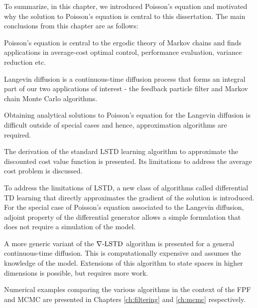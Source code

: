 To summarize, in this chapter, we introduced Poisson's equation and motivated why the solution to Poisson's equation is central to this dissertation. The main conclusions from this chapter are as follows:
\begin{romannum}
	\item Poisson's equation is central to the ergodic theory of Markov chains and finds applications in average-cost optimal control, performance evaluation, variance reduction etc. 
	\item Langevin diffusion is a continuous-time diffusion process that forms an integral part of our two applications of interest - the feedback particle filter and Markov chain Monte Carlo algorithms. 
	\item Obtaining analytical solutions to Poisson's equation for the Langevin diffusion is difficult outside of special cases and hence, approximation algorithms are required. 
	\item The derivation of the standard LSTD learning algorithm to approximate the discounted cost value function is presented. Its limitations to address the average cost problem is discussed.
	\item To address the limitations of LSTD, a new class of algorithms called differential TD learning that directly approximates the gradient of the solution is introduced.  For the special case of Poisson's equation associated to the Langevin diffusion, adjoint property of the differential generator allows a simple formulation that does not require a simulation of the model.
	\item A more generic variant of the $\nabla\text{-LSTD}$ algorithm is presented for a general continuous-time diffusion. This is computationally expensive and assumes the knowledge of the model. Extensions of this algorithm to state spaces in higher dimensions is possible, but requires more work. 
	\item  Numerical examples comparing the various algorithms in the context of the FPF and MCMC are presented in Chapters \ref{ch:filtering} and \ref{ch:mcmc} respectively. 
\end{romannum}




